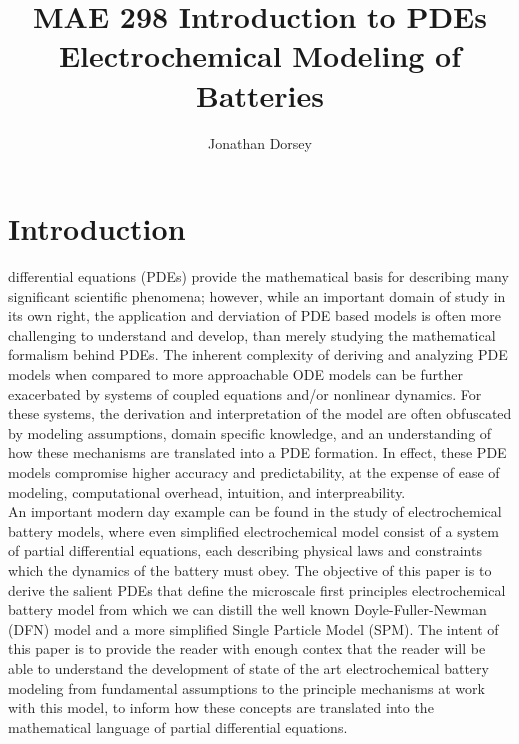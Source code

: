 \documentclass[lettersize,journal]{IEEEtran}
\begin{document}
\title{MAE 298 Introduction to PDEs \\ Electrochemical Modeling of Batteries}

\author{Jonathan Dorsey}



\maketitle


\section{Introduction}
 differential equations (PDEs) provide the mathematical basis for describing many significant scientific phenomena; however, while an important domain of study in its own right, the application and derviation of PDE based models is often more challenging to understand and develop, than merely studying the mathematical formalism behind PDEs. The inherent complexity of deriving and analyzing PDE models when compared to more approachable ODE models can be further exacerbated by systems of coupled equations and/or nonlinear dynamics. For these systems, the derivation and interpretation of the model are often obfuscated by modeling assumptions, domain specific knowledge, and an understanding of how these mechanisms are translated into a PDE formation. In effect, these PDE models compromise higher accuracy and predictability, at the expense of ease of modeling, computational overhead, intuition, and interpreability. \\

An important modern day example can be found in the study of electrochemical battery models, where even simplified electrochemical model consist of a system of partial differential equations, each describing physical laws and constraints which the dynamics of the battery must obey. The objective of this paper is to derive the salient PDEs that define the microscale first principles electrochemical battery model from which we can distill the well known Doyle-Fuller-Newman (DFN) model and a more simplified Single Particle Model (SPM). The intent of this paper is to provide the reader with enough contex that the reader will be able to understand the development of state of the art electrochemical battery modeling from fundamental assumptions to the principle mechanisms at work with this model, to inform how these concepts are translated into the mathematical language of partial differential equations.
\end{document}
